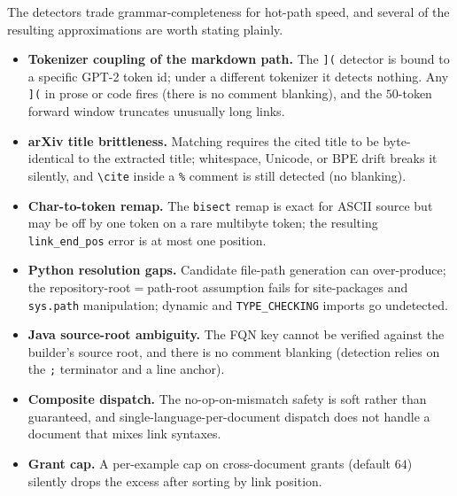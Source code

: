 The detectors trade grammar-completeness for hot-path speed, and several of the
resulting approximations are worth stating plainly.
\begin{itemize}
  \item \textbf{Tokenizer coupling of the markdown path.} The \texttt{](} detector
        is bound to a specific GPT-2 token id; under a different tokenizer it detects
        nothing. Any \texttt{](} in prose or code fires (there is no comment
        blanking), and the $50$-token forward window truncates unusually long links.
  \item \textbf{arXiv title brittleness.} Matching requires the cited title to be
        byte-identical to the extracted title; whitespace, Unicode, or BPE drift
        breaks it silently, and \texttt{\textbackslash cite} inside a \texttt{\%}
        comment is still detected (no blanking).
  \item \textbf{Char-to-token remap.} The \texttt{bisect} remap is exact for ASCII
        source but may be off by one token on a rare multibyte token; the resulting
        \texttt{link\_end\_pos} error is at most one position.
  \item \textbf{Python resolution gaps.} Candidate file-path generation can
        over-produce; the repository-root${=}$path-root assumption fails for
        site-packages and \texttt{sys.path} manipulation; dynamic and
        \texttt{TYPE\_CHECKING} imports go undetected.
  \item \textbf{Java source-root ambiguity.} The FQN key cannot be verified against
        the builder's source root, and there is no comment blanking (detection relies
        on the \texttt{;} terminator and a line anchor).
  \item \textbf{Composite dispatch.} The no-op-on-mismatch safety is soft rather than
        guaranteed, and single-language-per-document dispatch does not handle a
        document that mixes link syntaxes.
  \item \textbf{Grant cap.} A per-example cap on cross-document grants (default $64$)
        silently drops the excess after sorting by link position.
\end{itemize}
